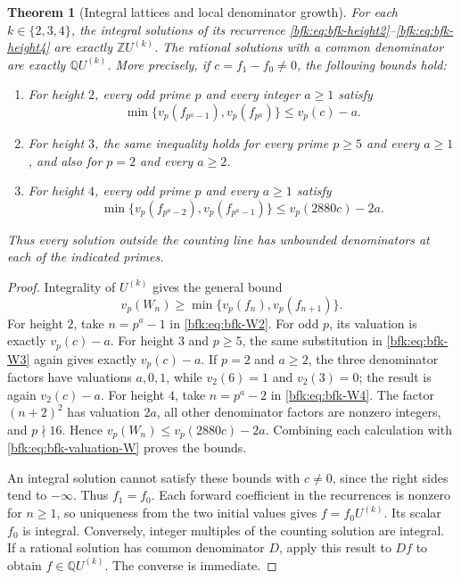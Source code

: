 \documentclass[11pt,a4paper]{article}
\newtheorem{theorem}{Theorem}[section]
\theoremstyle{definition}
\theoremstyle{remark}
\numberwithin{equation}{section}
\newcommand{\Q}{\mathbb{Q}}
\newcommand{\Z}{\mathbb{Z}}
\begin{document}
\begin{theorem}[Integral lattices and local denominator growth]\label{bfk:thm:bfk-integral-lattices}
For each $k\in\{2,3,4\}$, the integral solutions of its recurrence
\eqref{bfk:eq:bfk-height2}--\eqref{bfk:eq:bfk-height4} are exactly
$\Z U^{(k)}$. The rational solutions with a common denominator are exactly
$\Q U^{(k)}$.
More precisely, if $c=f_1-f_0\ne0$, the following bounds hold:
\begin{enumerate}
\item For height $2$, every odd prime $p$ and every integer $a\ge1$ satisfy
\[
 \min\{v_p(f_{p^a-1}),v_p(f_{p^a})\}\le v_p(c)-a.
\]
\item For height $3$, the same inequality holds for every prime
$p\ge5$ and every $a\ge1$, and also for $p=2$ and every $a\ge2$.
\item For height $4$, every odd prime $p$ and every $a\ge1$ satisfy
\[
 \min\{v_p(f_{p^a-2}),v_p(f_{p^a-1})\}
       \le v_p(2880c)-2a.
\]
\end{enumerate}
Thus every solution outside the counting line has unbounded denominators
at each of the indicated primes.
\end{theorem}
\begin{proof}
Integrality of $U^{(k)}$ gives the general bound
\begin{equation}\label{bfk:eq:bfk-valuation-W}
 v_p(W_n)\ge\min\{v_p(f_n),v_p(f_{n+1})\}.
\end{equation}
For height $2$, take $n=p^a-1$ in \eqref{bfk:eq:bfk-W2}.
For odd $p$, its valuation is exactly $v_p(c)-a$.
For height $3$ and $p\ge5$, the same substitution in
\eqref{bfk:eq:bfk-W3} again gives exactly $v_p(c)-a$.
If $p=2$ and $a\ge2$, the three denominator factors have valuations
$a,0,1$, while $v_2(6)=1$ and $v_2(3)=0$; the result is again
$v_2(c)-a$.
For height $4$, take $n=p^a-2$ in \eqref{bfk:eq:bfk-W4}.
The factor $(n+2)^2$ has valuation $2a$, all other denominator factors
are nonzero integers, and $p\nmid16$. Hence
$v_p(W_n)\le v_p(2880c)-2a$.
Combining each calculation with \eqref{bfk:eq:bfk-valuation-W} proves the bounds.

An integral solution cannot satisfy these bounds with $c\ne0$, since the
right sides tend to $-\infty$. Thus $f_1=f_0$. Each forward coefficient
in the recurrences is nonzero for $n\ge1$, so uniqueness from the two
initial values gives $f=f_0U^{(k)}$. Its scalar $f_0$ is integral.
Conversely, integer multiples of the counting solution are integral.
If a rational solution has common denominator $D$, apply this result to
$Df$ to obtain $f\in\Q U^{(k)}$. The converse is immediate.
\end{proof}
\end{document}

